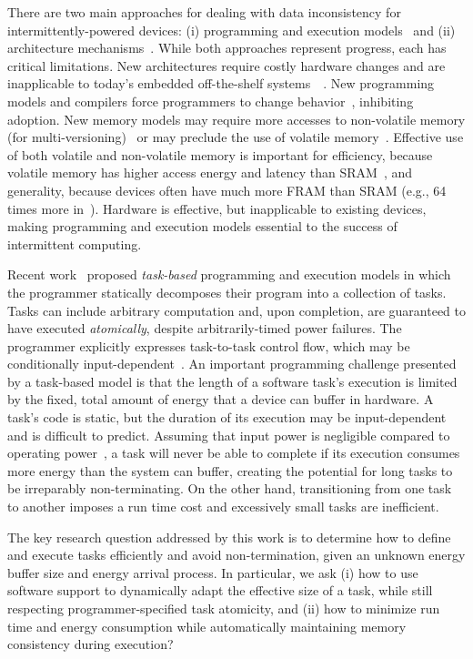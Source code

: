 There are two main approaches for dealing with data inconsistency for intermittently-powered devices: (i) programming and execution models~\cite{dino,ratchet,chain,alpaca} and (ii) architecture
mechanisms~\cite{hicks_isca_2017,idetic,nvp,tictpl}. While both approaches represent progress, each has critical limitations. New architectures require costly hardware changes and are inapplicable to today's embedded off-the-shelf systems~\cite[Fig. 3]{hicks_isca_2017}~\cite[Fig. 9]{nvp}. New programming models and compilers force programmers to change behavior~\cite{chain,ratchet}, inhibiting adoption.  New memory models may require more accesses to non-volatile memory (for multi-versioning)~\cite{dino,chain} or may preclude
the use of volatile memory~\cite{ratchet}. Effective use of both volatile and non-volatile memory is important for efficiency, because volatile memory has higher access energy and latency than SRAM~\cite[Fig. 4]{nvp}, and generality, because devices often have much more FRAM than SRAM (e.g., 64 times more in~\cite{wolverine}). Hardware is effective, but inapplicable to existing devices, making programming and execution models essential to the success of intermittent computing.

Recent work~\cite{alpaca,chain} proposed {\em task-based} programming and execution models in which the programmer statically decomposes their program into a collection of tasks. Tasks can include arbitrary computation and, upon completion, are guaranteed to have executed {\em atomically}, despite arbitrarily-timed power failures. The programmer explicitly expresses task-to-task control flow, which may be conditionally input-dependent~\cite[Fig. 4]{chain}. An important programming challenge presented by a task-based model is that the length of a software task's execution
is limited by the fixed, total amount of energy that a device can buffer in hardware.  A task's code is static, but the duration of its execution may be input-dependent and is difficult to predict. Assuming that input power is negligible compared to operating power~\cite{wisp}, a task will never be able to complete if its execution consumes more energy than the system can buffer, creating the potential for long tasks to be irreparably non-terminating. On the other hand, transitioning from one task to another imposes a run time cost and excessively small tasks are inefficient. 

The key research question addressed by this work is to determine how to define and execute tasks efficiently and avoid non-termination, given an unknown energy buffer size and energy arrival process. In particular, we ask (i) how to use software support to dynamically adapt the effective size of a task, while still respecting programmer-specified task atomicity, and (ii) how to minimize run time and energy consumption while automatically maintaining memory consistency during execution?

